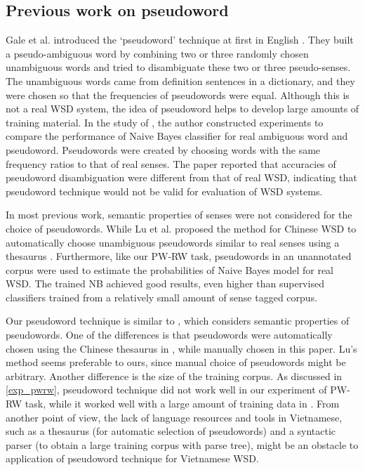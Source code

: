 \documentclass[english]{jnlp_1.4}
\begin{document}
\subsection{Previous work on pseudoword} \label{PWpreviouswork}
Gale et al. introduced the `pseudoword' technique at first in English \cite{Gale1992}. 
They built a pseudo-ambiguous word by combining two or three randomly chosen unambiguous words and tried to disambiguate these two or three pseudo-senses.
The unambiguous words came from definition sentences in a dictionary,
and they were chosen so that the frequencies of pseudowords were equal.
Although this is not a real WSD system,
the idea of pseudoword helps to develop large amounts of training material.
In the study of \cite{Gaustad:01}, 
the author constructed experiments to compare the performance of Naive Bayes classifier for real ambiguous word and pseudoword.
Pseudowords were created by choosing words with the same frequency ratios to that of real senses.
The paper reported that accuracies of pseudoword disambiguation were different from that of real WSD,
indicating that pseudoword technique would not be valid for evaluation of WSD systems.

In most previous work,
semantic properties of senses were not considered for the choice of pseudowords.
While Lu et al. proposed the method for Chinese WSD to automatically choose unambiguous pseudowords similar to real senses using a thesaurus \cite{Lu2006}.
Furthermore,
like our PW-RW task,
pseudowords in an unannotated corpus were used to estimate the probabilities of Naive Bayes model for real WSD.
The trained NB achieved good results, 
even higher than supervised classifiers trained from a relatively small amount of sense tagged corpus.

Our pseudoword technique is similar to \cite{Lu2006}, which considers semantic properties of pseudowords.
One of the differences is that pseudowords were automatically chosen using the Chinese thesaurus in \cite{Lu2006}, while manually chosen in this paper.
Lu's method seems preferable to ours,
since manual choice of pseudowords might be arbitrary.
Another difference is the size of the training corpus.
As discussed in \ref{exp_pwrw},
pseudoword technique did not work well in our experiment of PW-RW task,
while it worked well with a large amount of training data in \cite{Lu2006}.
From another point of view,
the lack of language resources and tools in Vietnamese,
such as a thesaurus (for automatic selection of pseudowords)
and a syntactic parser (to obtain a large training corpus with parse tree),
might be an obstacle to application of pseudoword technique for Vietnamese WSD.
\end{document}
